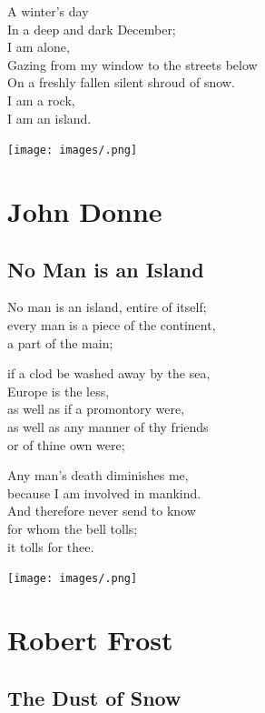 \documentclass[
]{book}
\renewenvironment{quote}{\begin{VF}}{\end{VF}}
\begin{document}
\begin{quote}
A winter's day\\
In a deep and dark December;\\
I am alone,\\
Gazing from my window to the streets below\\
On a freshly fallen silent shroud of snow.\\
I am a rock,\\
I am an island.
\end{quote}

\texttt{[image: images/.png]}

\hypertarget{john-donne}{%
\chapter{John Donne}\label{john-donne}}

\hypertarget{no-man-is-an-island}{%
\section{No Man is an Island}\label{no-man-is-an-island}}

\begin{quote}
No man is an island, entire of itself;\\
every man is a piece of the continent,\\
a part of the main;

if a clod be washed away by the sea,\\
Europe is the less,\\
as well as if a promontory were,\\
as well as any manner of thy friends\\
or of thine own were;

Any man's death diminishes me,\\
because I am involved in mankind.\\
And therefore never send to know\\
for whom the bell tolls;\\
it tolls for thee.
\end{quote}

\texttt{[image: images/.png]}

\hypertarget{robert-frost}{%
\chapter{Robert Frost}\label{robert-frost}}

\hypertarget{the-dust-of-snow}{%
\section{The Dust of Snow}\label{the-dust-of-snow}}
\end{document}
